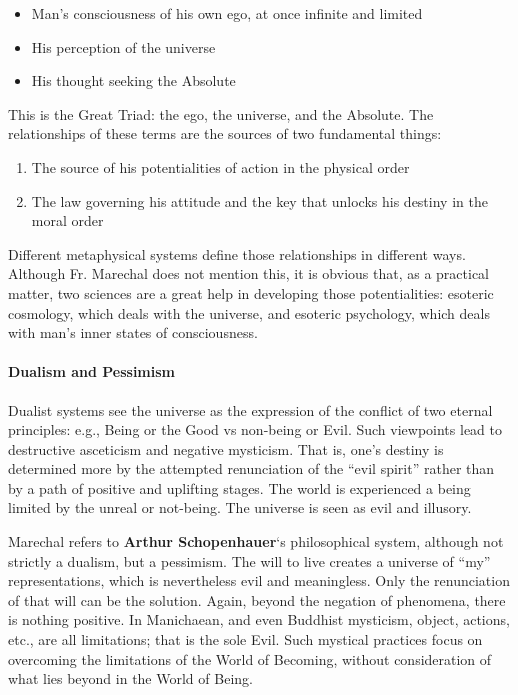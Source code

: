 \begin{itemize}


\item Man's consciousness of his own ego, at once infinite and limited

\item His perception of the universe

\item His thought seeking the Absolute
\end{itemize}


This is the Great Triad: the ego, the universe, and the Absolute. The relationships of these terms are the sources of two fundamental things:

\begin{enumerate}


\item The source of his potentialities of action in the physical order

\item The law governing his attitude and the key that unlocks his destiny in the moral order
\end{enumerate}


Different metaphysical systems define those relationships in different ways. Although Fr. Marechal does not mention this, it is obvious that, as a practical matter, two sciences are a great help in developing those potentialities: esoteric cosmology, which deals with the universe, and esoteric psychology, which deals with man's inner states of consciousness.

\paragraph{Dualism and Pessimism}


Dualist systems see the universe as the expression of the conflict of two eternal principles: e.g., Being or the Good vs non-being or Evil. Such viewpoints lead to destructive asceticism and negative mysticism. That is, one's destiny is determined more by the attempted renunciation of the ``evil spirit'' rather than by a path of positive and uplifting stages. The world is experienced a being limited by the unreal or not-being. The universe is seen as evil and illusory.

Marechal refers to \textbf{Arthur Schopenhauer}`s philosophical system, although not strictly a dualism, but a pessimism. The will to live creates a universe of ``my'' representations, which is nevertheless evil and meaningless. Only the renunciation of that will can be the solution. Again, beyond the negation of phenomena, there is nothing positive. In Manichaean, and even Buddhist mysticism, object, actions, etc., are all limitations; that is the sole Evil. Such mystical practices focus on overcoming the limitations of the World of Becoming, without consideration of what lies beyond in the World of Being.

